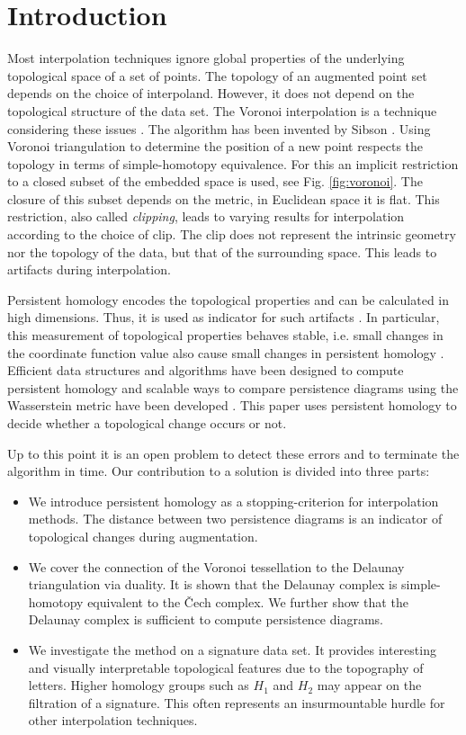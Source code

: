 \documentclass[runningheads]{llncs}
\begin{document}
\section{Introduction}
\label{introduction}
Most interpolation techniques ignore global properties of the underlying topological space of a set of points. The topology of an augmented point set depends on the choice of interpoland. However, it does not depend on the topological structure of the data set. The Voronoi interpolation is a technique considering these issues \cite{Bobach2009}. The algorithm has been invented by Sibson \cite{Sibson}. Using Voronoi triangulation to determine the position of a new point respects the topology in terms of simple-homotopy equivalence. For this an implicit restriction to a closed subset of the embedded space is used, see Fig. \ref{fig:voronoi}. The closure of this subset depends on the metric, in Euclidean space it is flat. This restriction, also called \textit{clipping}, leads to varying results for interpolation according to the choice of clip. The clip does not represent the intrinsic geometry nor the topology of the data, but that of the surrounding space. This leads to artifacts during interpolation.

Persistent homology encodes the topological properties and can be calculated in high dimensions. Thus, it is used as indicator for such artifacts \cite{ZomorodianC05}. In particular, this measurement of topological properties behaves stable, i.e. small changes in the coordinate function value also cause small changes in persistent homology \cite{CerriL16}. Efficient data structures and algorithms have been designed to compute persistent homology \cite{ZomorodianC05,Zomorodian10} and scalable ways to compare persistence diagrams using the Wasserstein metric have been developed \cite{CarriereCO17}. This paper uses persistent homology to decide whether a topological change occurs or not.

Up to this point it is an open problem to detect these errors and to terminate the algorithm in time. Our contribution to a solution is divided into three parts:
\begin{itemize}
  \item We introduce persistent homology as a stopping-criterion for interpolation methods. The distance between two persistence diagrams is an indicator of topological changes during augmentation.
  \item We cover the connection of the Voronoi tessellation to the Delaunay triangulation via duality. It is shown that the Delaunay complex is simple-homotopy equivalent to the \v{C}ech complex. We further show that the Delaunay complex is sufficient to compute persistence diagrams.
  \item We investigate the method on a signature data set. It provides interesting and visually interpretable topological features due to the topography of letters. Higher homology groups such as $H_1$ and $H_2$ may appear on the filtration of a signature. This often represents an insurmountable hurdle for other interpolation techniques.
\end{itemize}
\end{document}
